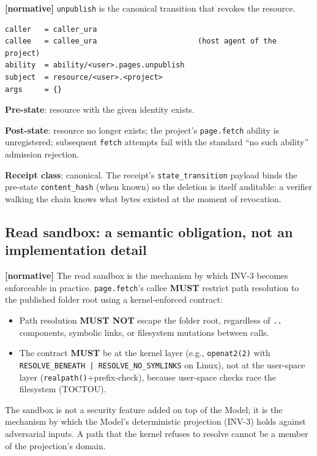 \documentclass[11pt,a4paper]{article}
\newcommand{\normsv}{\textcolor{normativecolor}{\textbf{[normative]}}\xspace}
\theoremstyle{definition}
\begin{document}
\normsv{} \texttt{unpublish} is the canonical transition that
revokes the resource.

\begin{lstlisting}
caller   = caller_ura
callee   = callee_ura                       (host agent of the project)
ability  = ability/<user>.pages.unpublish
subject  = resource/<user>.<project>
args     = {}
\end{lstlisting}

\textbf{Pre-state}: resource with the given identity exists.

\textbf{Post-state}: resource no longer exists; the project's
\texttt{page.fetch} ability is unregistered; subsequent
\texttt{fetch} attempts fail with the standard
``no such ability'' admission rejection.

\textbf{Receipt class}: canonical. The receipt's
\texttt{state\_transition} payload binds the pre-state
\texttt{content\_hash} (when known) so the deletion is itself
auditable: a verifier walking the chain knows what bytes
existed at the moment of revocation.

\subsection{Read sandbox: a semantic obligation, not an implementation detail}

\normsv{} The read sandbox is the mechanism by which INV-3
becomes enforceable in practice. \texttt{page.fetch}'s callee
\textbf{MUST} restrict path resolution to the published folder
root using a kernel-enforced contract:

\begin{itemize}[leftmargin=2em,itemsep=0.1em]
    \item Path resolution \textbf{MUST NOT} escape the
    folder root, regardless of \texttt{..} components,
    symbolic links, or filesystem mutations between calls.
    \item The contract \textbf{MUST} be at the kernel layer
    (e.g., \texttt{openat2(2)} with
    \texttt{RESOLVE\_BENEATH | RESOLVE\_NO\_SYMLINKS} on Linux),
    not at the user-space layer
    (\texttt{realpath()}+prefix-check), because user-space
    checks race the filesystem (TOCTOU).
\end{itemize}

The sandbox is not a security feature added on top of the
Model; it is the mechanism by which the Model's deterministic
projection (INV-3) holds against adversarial inputs. A path
that the kernel refuses to resolve cannot be a member of the
projection's domain.
\end{document}
